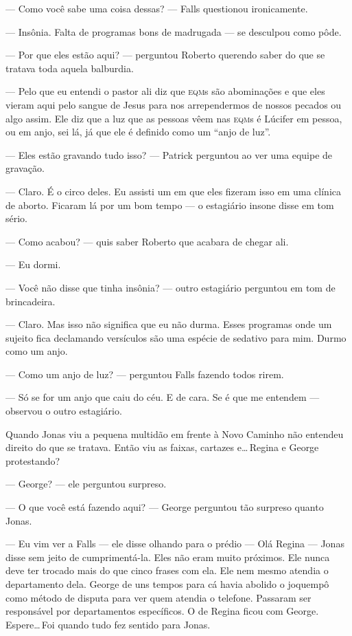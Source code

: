 --- Como você sabe uma coisa dessas? --- Falls questionou ironicamente.

--- Insônia. Falta de programas bons de madrugada --- se desculpou como pôde.

--- Por que eles estão aqui? --- perguntou Roberto\mudanca{,} querendo saber do que se tratava toda aquela balburdia.

--- Pelo que eu entendi o pastor ali diz que \textsc{eqm}s são abominações\mudanca{,} e que eles vieram aqui pelo sangue de Jesus para nos arrependermos de nossos pecados\mudanca{,} ou algo assim. Ele diz que a luz que as pessoas vêem nas \textsc{eqm}s é Lúcifer em pessoa, ou em anjo, sei lá, já que ele é definido como um ``anjo de luz''.

--- Eles estão gravando tudo isso? --- Patrick perguntou ao ver uma equipe de gravação.

--- Claro. É o circo deles. Eu assisti um em que eles fizeram isso em uma clínica de aborto. Ficaram lá por um bom tempo --- o estagiário insone disse em tom sério.

--- Como acabou? --- quis saber Roberto que acabara de chegar ali.

--- Eu dormi.

--- Você não disse que tinha insônia? --- outro estagiário perguntou\mudanca{,} em tom de brincadeira.

--- Claro. Mas isso não significa que eu não durma. Esses programas onde um sujeito fica declamando versículos são uma espécie de sedativo para mim. Durmo como um anjo.

--- Como um anjo de luz? --- perguntou Falls\mudanca{,} fazendo todos rirem.

--- Só se for um anjo que caiu do céu. E de cara. Se é que me entendem --- observou o outro estagiário.

Quando Jonas viu a pequena multidão em frente à Novo Caminho\mudanca{,} não entendeu direito do que se tratava. Então viu as faixas, cartazes e\ldots\,Regina e George protestando?

--- George? --- ele perguntou\mudanca{,} surpreso.

--- O que você está fazendo aqui? --- George perguntou tão surpreso quanto Jonas.

--- Eu vim ver a Falls --- ele disse\mudanca{,} olhando para o prédio --- Olá\mudanca{,} Regina --- Jonas disse\mudanca{,} sem jeito de cumprimentá-la. Eles não eram muito próximos. Ele nunca deve ter trocado mais do que cinco frases com ela. Ele nem mesmo atendia o departamento dela. George\mudanca{,} de uns tempos para cá\mudanca{,} havia abolido o joquempô como método de disputa para ver quem atendia o telefone. Passaram  ser responsável por departamentos específicos. O de Regina ficou com George. Espere\ldots\,Foi quando tudo fez sentido para Jonas.

